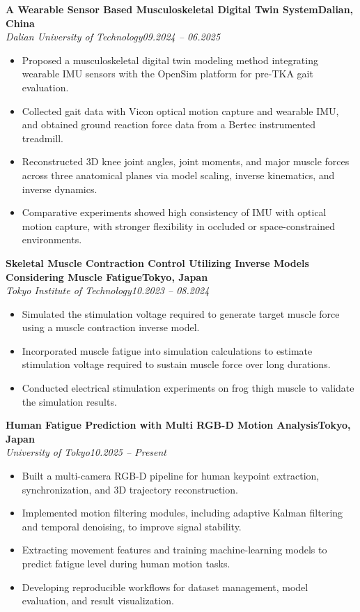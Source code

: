 \documentclass[11pt,a4paper]{article}
\newcommand{\cvproject}[4]{%
  \textbf{#1}\hfill \textbf{#2}\\
  \textit{#3}\hfill \textit{#4}\\[-6pt]
}
\begin{document}
\cvproject
{A Wearable Sensor Based Musculoskeletal Digital Twin System}{Dalian, China}
{Dalian University of Technology}{09.2024 -- 06.2025}
\vspace{-5pt}
\begin{itemize}
  \item Proposed a musculoskeletal digital twin modeling method integrating wearable IMU sensors with the OpenSim platform for pre-TKA gait evaluation.
  \item Collected gait data with Vicon optical motion capture and wearable IMU, and obtained ground reaction force data from a Bertec instrumented treadmill.
  \item Reconstructed 3D knee joint angles, joint moments, and major muscle forces across three anatomical planes via model scaling, inverse kinematics, and inverse dynamics.
  \item Comparative experiments showed high consistency of IMU with optical motion capture, with stronger flexibility in occluded or space-constrained environments.
\end{itemize}

\cvproject
{Skeletal Muscle Contraction Control Utilizing Inverse Models Considering Muscle Fatigue}{Tokyo, Japan}
{Tokyo Institute of Technology}{10.2023 -- 08.2024}
\vspace{-5pt}
\begin{itemize}
  \item Simulated the stimulation voltage required to generate target muscle force using a muscle contraction inverse model.
  \item Incorporated muscle fatigue into simulation calculations to estimate stimulation voltage required to sustain muscle force over long durations.
  \item Conducted electrical stimulation experiments on frog thigh muscle to validate the simulation results.
\end{itemize}

\cvproject
{Human Fatigue Prediction with Multi RGB-D Motion Analysis}{Tokyo, Japan}
{University of Tokyo}{10.2025 -- Present}

\vspace{-5pt}
\begin{itemize}
  \item Built a multi-camera RGB-D pipeline for human keypoint extraction, synchronization, and 3D trajectory reconstruction.
  \item Implemented motion filtering modules, including adaptive Kalman filtering and temporal denoising, to improve signal stability.
  \item Extracting movement features and training machine-learning models to predict fatigue level during human motion tasks.
  \item Developing reproducible workflows for dataset management, model evaluation, and result visualization.
\end{itemize}
\end{document}
